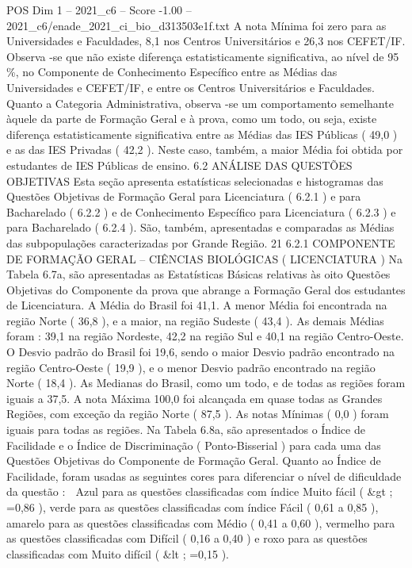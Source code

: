 \begin{textsample}{POS Dim 1 – 2021\_c6 – Score -1.00 – 2021\_c6/enade\_2021\_ci\_bio\_d313503e1f.txt}
A nota Mínima foi zero para as Universidades e Faculdades, 8,1 nos Centros Universitários e 26,3 nos CEFET/IF.
Observa -se que não existe diferença estatisticamente significativa, ao nível de 95 \%, no Componente de Conhecimento Específico entre as Médias das Universidades e CEFET/IF, e entre os Centros Universitários e Faculdades.
Quanto a Categoria Administrativa, observa -se um comportamento semelhante àquele da parte de Formação Geral e à prova, como um todo, ou seja, existe diferença estatisticamente significativa entre as Médias das IES Públicas ( 49,0 ) e as das IES Privadas ( 42,2 ).
Neste caso, também, a maior Média foi obtida por estudantes de IES Públicas de ensino. 6.2 ANÁLISE DAS QUESTÕES OBJETIVAS Esta seção apresenta estatísticas selecionadas e histogramas das Questões Objetivas de Formação Geral para Licenciatura ( 6.2.1 ) e para Bacharelado ( 6.2.2 ) e de Conhecimento Específico para Licenciatura ( 6.2.3 ) e para Bacharelado ( 6.2.4 ).
São, também, apresentadas e comparadas as Médias das subpopulações caracterizadas por Grande Região. 21 6.2.1 COMPONENTE DE FORMAÇÃO GERAL – CIÊNCIAS BIOLÓGICAS ( LICENCIATURA ) Na Tabela 6.7a, são apresentadas as Estatísticas Básicas relativas às oito Questões Objetivas do Componente da prova que abrange a Formação Geral dos estudantes de Licenciatura.
A Média do Brasil foi 41,1.
A menor Média foi encontrada na região Norte ( 36,8 ), e a maior, na região Sudeste ( 43,4 ).
As demais Médias foram : 39,1 na região Nordeste, 42,2 na região Sul e 40,1 na região Centro-Oeste.
O Desvio padrão do Brasil foi 19,6, sendo o maior Desvio padrão encontrado na região Centro-Oeste ( 19,9 ), e o menor Desvio padrão encontrado na região Norte ( 18,4 ).
As Medianas do Brasil, como um todo, e de todas as regiões foram iguais a 37,5.
A nota Máxima 100,0 foi alcançada em quase todas as Grandes Regiões, com exceção da região Norte ( 87,5 ).
As notas Mínimas ( 0,0 ) foram iguais para todas as regiões.
Na Tabela 6.8a, são apresentados o Índice de Facilidade e o Índice de Discriminação ( Ponto-Bisserial ) para cada uma das Questões Objetivas do Componente de Formação Geral.
Quanto ao Índice de Facilidade, foram usadas as seguintes cores para diferenciar o nível de dificuldade da questão :  Azul para as questões classificadas com índice Muito fácil ( \&gt ; =0,86 ), verde para as questões classificadas com índice Fácil ( 0,61 a 0,85 ), amarelo para as questões classificadas com Médio ( 0,41 a 0,60 ), vermelho para as questões classificadas com Difícil ( 0,16 a 0,40 ) e roxo para as questões classificadas com Muito difícil ( \&lt ; =0,15 ).

\end{textsample}
